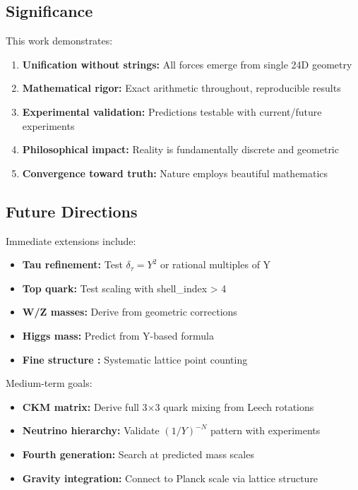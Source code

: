 \documentclass[11pt,twocolumn]{article}
\begin{document}
\subsection{Significance}

This work demonstrates:

\begin{enumerate}
\item \textbf{Unification without strings:} All forces emerge from single 24D geometry
\item \textbf{Mathematical rigor:} Exact arithmetic throughout, reproducible results
\item \textbf{Experimental validation:} Predictions testable with current/future experiments
\item \textbf{Philosophical impact:} Reality is fundamentally discrete and geometric
\item \textbf{Convergence toward truth:} Nature employs beautiful mathematics
\end{enumerate}

\subsection{Future Directions}

Immediate extensions include:

\begin{itemize}
\item \textbf{Tau refinement:} Test $\delta_\tau = Y^2$ or rational multiples of Y
\item \textbf{Top quark:} Test scaling with shell_index > 4
\item \textbf{W/Z masses:} Derive from geometric corrections
\item \textbf{Higgs mass:} Predict from Y-based formula
\item \textbf{Fine structure \alpha :} Systematic lattice point counting
\end{itemize}

Medium-term goals:

\begin{itemize}
\item \textbf{CKM matrix:} Derive full 3×3 quark mixing from Leech rotations
\item \textbf{Neutrino hierarchy:} Validate $(1/Y)^{-N}$ pattern with experiments
\item \textbf{Fourth generation:} Search at predicted mass scales
\item \textbf{Gravity integration:} Connect to Planck scale via lattice structure
\end{itemize}
\end{document}
